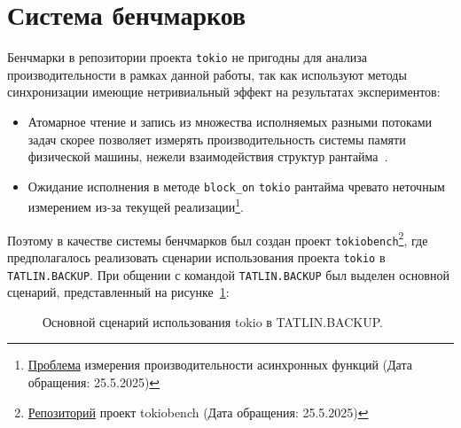 
\section{Система бенчмарков}

Бенчмарки в репозитории проекта \verb|tokio| не пригодны для анализа производительности в рамках данной работы, так как используют методы синхронизации имеющие нетривиальный эффект на результатах экспериментов:

\begin{itemize}
    \item Атомарное чтение и запись из множества исполняемых разными потоками задач скорее позволяет измерять производительность системы памяти физической машины, нежели взаимодействия структур рантайма~\cite{atomicOnModerHardware}.
    \item Ожидание исполнения в методе \verb|block_on| \verb|tokio| рантайма чревато неточным измерением из-за текущей реализации\footnote{\href{https://github.com/bheisler/criterion.rs/issues/819}{Проблема} измерения производительности асинхронных функций (Дата обращения: 25.5.2025)}.
\end{itemize}

Поэтому в качестве системы бенчмарков был создан проект \verb|tokiobench|\footnote{\href{https://github.com/IgorErin/tokiobench}{Репозиторий} проект tokiobench (Дата обращения: 25.5.2025)}, где предполагалось реализовать сценарии использования проекта \verb|tokio| в \verb|TATLIN.BACKUP|. При общении с командой \verb|TATLIN.BACKUP| был выделен основной сценарий, представленный на рисунке~\ref{fig:scenario}:

\begin{figure}[H]
    \begin{center}
    \end{center}

    \caption{Основной сценарий использования tokio в TATLIN.BACKUP.}
    \label{fig:scenario}
\end{figure}

